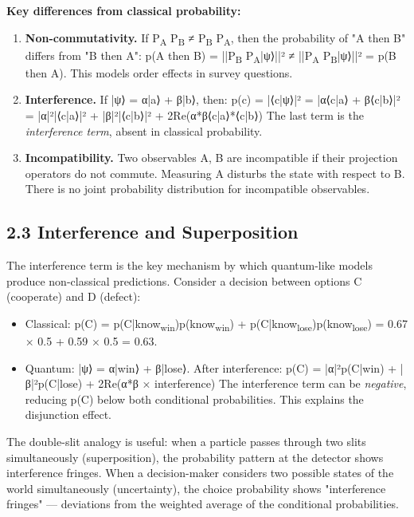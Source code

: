 \documentclass[11pt]{article}
\begin{document}
\textbf{Key differences from classical probability:}

\begin{enumerate}
\item \textbf{Non-commutativity.} If P\textsubscript{A} P\textsubscript{B} ≠ P\textsubscript{B} P\textsubscript{A}, then the probability of "A then B"
differs from "B then A":
p(A then B) = ||P\textsubscript{B} P\textsubscript{A}|ψ⟩||² ≠ ||P\textsubscript{A} P\textsubscript{B}|ψ⟩||² = p(B then A).
This models order effects in survey questions.

\item \textbf{Interference.} If |ψ⟩ = α|a⟩ + β|b⟩, then:
p(c) = |⟨c|ψ⟩|² = |α⟨c|a⟩ + β⟨c|b⟩|²
     = |α|²|⟨c|a⟩|² + |β|²|⟨c|b⟩|² + 2Re(α*β⟨c|a⟩*⟨c|b⟩)
The last term is the \emph{interference term}, absent in classical probability.

\item \textbf{Incompatibility.} Two observables A, B are incompatible if their projection
operators do not commute. Measuring A disturbs the state with respect to B.
There is no joint probability distribution for incompatible observables.
\end{enumerate}
\subsection{2.3 Interference and Superposition}
\label{sec:org8ebe4f4}

The interference term is the key mechanism by which quantum-like models produce
non-classical predictions. Consider a decision between options C (cooperate) and
D (defect):

\begin{itemize}
\item Classical: p(C) = p(C|know\textsubscript{win})p(know\textsubscript{win}) + p(C|know\textsubscript{lose})p(know\textsubscript{lose})
= 0.67 × 0.5 + 0.59 × 0.5 = 0.63.
\item Quantum: |ψ⟩ = α|win⟩ + β|lose⟩. After interference:
p(C) = |α|²p(C|win) + |β|²p(C|lose) + 2Re(α*β × interference)
The interference term can be \emph{negative}, reducing p(C) below both conditional
probabilities. This explains the disjunction effect.
\end{itemize}

The double-slit analogy is useful: when a particle passes through two slits
simultaneously (superposition), the probability pattern at the detector shows
interference fringes. When a decision-maker considers two possible states of
the world simultaneously (uncertainty), the choice probability shows
"interference fringes" --- deviations from the weighted average of the
conditional probabilities.
\end{document}
